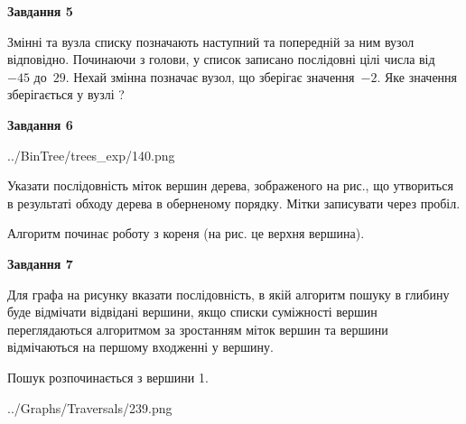 \documentclass[12pt, ukrainian]{article}
\begin{document}
{\begin {large}
{\begin {center}\textbf{Завдання 5}\end {center}}\par
Змінні  та  вузла списку позначають наступний та попередній за ним вузол відповідно. Починаючи з голови, у список записано послідовні цілі числа від~$-45$ до~$29$. Нехай змінна  позначає вузол, що зберігає значення~$-2$.
Яке значення зберігається у вузлі  ?\par
\newpage

{\begin {center}\textbf{Завдання 6}\end {center}}\par

\begin{center}
	{../BinTree/trees_exp/140.png}
\end{center}
Указати послідовність міток вершин дерева, зображеного на рис., що утвориться в результаті обходу дерева в оберненому порядку. Мітки записувати через пробіл.\par Алгоритм починає роботу з кореня (на рис. це верхня вершина).\par
\newpage

{\begin {center}\textbf{Завдання 7}\end {center}}\par
Для графа на рисунку вказати послідовність, в якій алгоритм пошуку в глибину буде відмічати відвідані вершини, якщо списки суміжності вершин переглядаються алгоритмом за зростанням міток вершин та вершини відмічаються на першому вход\-женні у вершину.\par
Пошук розпочинається з вершини 1.\par

\begin{center}
	{../Graphs/Traversals/239.png}
\end{center}\par
\newpage


\end{large}}
\end{document}
